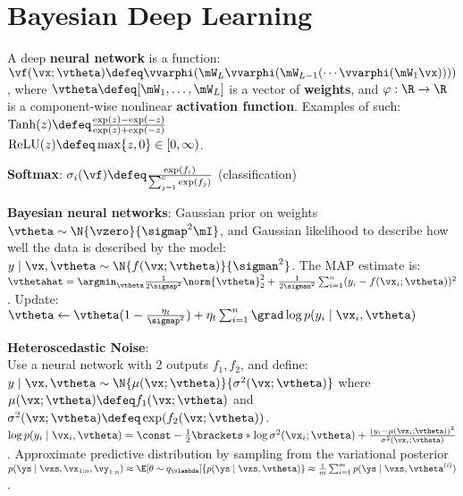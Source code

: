 \section{Bayesian Deep Learning}
\begin{framed}
    A deep \textbf{neural network} is a function: $\vf(\vx; \vtheta) \defeq \vvarphi(\mW_L \vvarphi(\mW_{L-1} ( \cdots \vvarphi(\mW_1 \vx))))$, where $\vtheta \defeq [\mW_1, \dots, \mW_L]$ is a vector of \textbf{weights}, and $\varphi : \R \to \R$ is a component-wise nonlinear \textbf{activation function}. Examples of such: \\
    $\mathrm{Tanh}(z) \defeq \frac{\exp(z) - \exp(-z)}{\exp(z) + \exp(-z)}$ \\
    $\mathrm{ReLU}(z) \defeq \max \{z, 0\} \in [0, \infty)$.
\end{framed}
\textbf{Softmax}: $\sigma_i(\vf) \defeq \frac{\exp(f_i)}{\sum_{j=1}^c \exp(f_j)}$ (classification)
\begin{framed}
    \textbf{Bayesian neural networks}: Gaussian prior on weights $\vtheta \sim \N{\vzero}{\sigmap^2 \mI}$, and Gaussian likelihood to describe how well the data is described by the model: \\
    $y \mid \vx, \vtheta \sim \N{f(\vx; \vtheta)}{\sigman^2}$. The MAP estimate is: \\
    $\vthetahat = \argmin_\vtheta \frac{1}{2 \sigmap^2} \norm{\vtheta}_2^2 + \frac{1}{2 \sigman^2} \sum_{i=1}^n (y_i - f(\vx_i; \vtheta))^2$. Update: $\vtheta \gets \vtheta(1 - \frac{\eta_t}{\sigmap^2}) + \eta_t \sum_{i=1}^n \grad \log p(y_i \mid \vx_i, \vtheta)$
\end{framed}
\textbf{Heteroscedastic Noise}:\\ Use a neural network with 2 outputs $f_1, f_2$, and define: $y \mid \vx, \vtheta \sim \N{\mu(\vx; \vtheta)}{\sigma^2(\vx; \vtheta)}$ where $\mu(\vx; \vtheta) \defeq f_1(\vx; \vtheta)$ and $\sigma^2(\vx; \vtheta) \defeq \exp(f_2(\vx; \vtheta))$.
$\log p(y_i \mid \vx_i, \vtheta) = \const - \frac{1}{2} \brackets*{\log \sigma^2(\vx_i; \vtheta) + \frac{(y_i - \mu(\vx_i; \vtheta))^2}{\sigma^2(\vx_i; \vtheta)}}$.
Approximate predictive distribution by sampling from the variational posterior $p(\ys \mid \vxs, \vx_{1:n}, \vy_{1:n}) \approx \E[\theta \sim q_\vlambda]{p(\ys \mid \vxs, \vtheta)}\approx \frac{1}{m} \sum_{i=1}^m p(\ys \mid \vxs, \vtheta^{(i)})$.